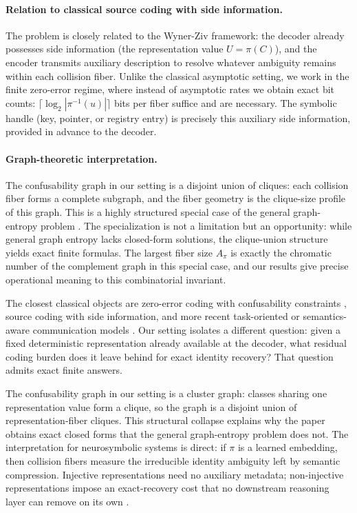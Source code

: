 \paragraph{Relation to classical source coding with side information.} The problem is closely related to the Wyner-Ziv framework: the decoder already possesses side information (the representation value $U=\pi(C)$), and the encoder transmits auxiliary description to resolve whatever ambiguity remains within each collision fiber. Unlike the classical asymptotic setting, we work in the finite zero-error regime, where instead of asymptotic rates we obtain exact bit counts: $\lceil \log_2 |\pi^{-1}(u)|\rceil$ bits per fiber suffice and are necessary. The symbolic handle (key, pointer, or registry entry) is precisely this auxiliary side information, provided in advance to the decoder.

\paragraph{Graph-theoretic interpretation.} The confusability graph in our setting is a disjoint union of cliques: each collision fiber forms a complete subgraph, and the fiber geometry is the clique-size profile of this graph. This is a highly structured special case of the general graph-entropy problem \cite{korner1973coding, simonyi1995graph}. The specialization is not a limitation but an opportunity: while general graph entropy lacks closed-form solutions, the clique-union structure yields exact finite formulas. The largest fiber size $A_\pi$ is exactly the chromatic number of the complement graph in this special case, and our results give precise operational meaning to this combinatorial invariant.

The closest classical objects are zero-error coding with confusability constraints \cite{korner1973coding, witsenhausen1976zero}, source coding with side information, and more recent task-oriented or semantics-aware communication models \cite{gunduz2023beyond}. Our setting isolates a different question: given a fixed deterministic representation already available at the decoder, what residual coding burden does it leave behind for exact identity recovery? That question admits exact finite answers.

The confusability graph in our setting is a cluster graph: classes sharing one representation value form a clique, so the graph is a disjoint union of representation-fiber cliques. This structural collapse explains why the paper obtains exact closed forms that the general graph-entropy problem does not. The interpretation for neurosymbolic systems is direct: if $\pi$ is a learned embedding, then collision fibers measure the irreducible identity ambiguity left by semantic compression. Injective representations need no auxiliary metadata; non-injective representations impose an exact-recovery cost that no downstream reasoning layer can remove on its own \cite{koh2020concept, garcez2020neurosymbolic}.

